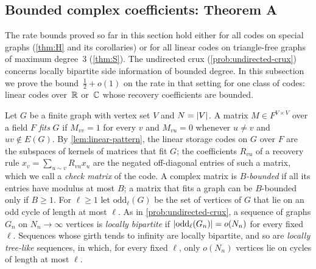 
\subsection{Bounded complex coefficients: Theorem A}\label{sec:ana-A}

The rate bounds proved so far in this section hold either for all codes on special graphs (\cref{thm:H} and its
corollaries) or for all linear codes on triangle-free graphs of maximum degree~$3$ (\cref{thm:S}). The undirected crux
(\cref{prob:undirected-crux}) concerns locally bipartite side information of bounded degree. In this subsection we
prove the bound~$\frac12+o(1)$ on the rate in that setting for one class of codes: linear codes over~$\mathbb{R}$ or~$\mathbb{C}$
whose recovery coefficients are bounded.

Let $G$ be a finite graph with vertex set $V$ and $N=\lvert V \rvert$. A matrix $M\in F^{V\times V}$ over a field $F$
\emph{fits} $G$ if $M_{vv}=1$ for every $v$ and $M_{vu}=0$ whenever $u\ne v$ and $uv\notin E(G)$. By
\cref{lem:linear-pattern}, the linear storage codes on $G$ over $F$ are the subspaces of kernels of matrices that fit
$G$; the coefficients $R_{vu}$ of a recovery rule $x_v=\sum_{u\sim v}R_{vu}x_u$ are the negated off-diagonal entries of
such a matrix, which we call a \emph{check matrix} of the code.
A complex matrix is \emph{$B$-bounded} if all its entries have modulus at most $B$; a matrix that fits a
graph can be $B$-bounded only if $B\ge1$. For $\ell\ge1$ let $\mathrm{odd}_\ell(G)$ be the set of vertices of $G$ that
lie on an odd cycle of length at most $\ell$. As in \cref{prob:undirected-crux}, a sequence of graphs $G_n$ on
$N_n\to\infty$ vertices is \emph{locally bipartite} if $\lvert \mathrm{odd}_\ell(G_n) \rvert=o(N_n)$ for every fixed $\ell$.
Sequences whose girth tends to infinity
are locally bipartite, and so are \emph{locally tree-like} sequences, in which, for every fixed $\ell$, only $o(N_n)$
vertices lie on cycles of length at most $\ell$.

